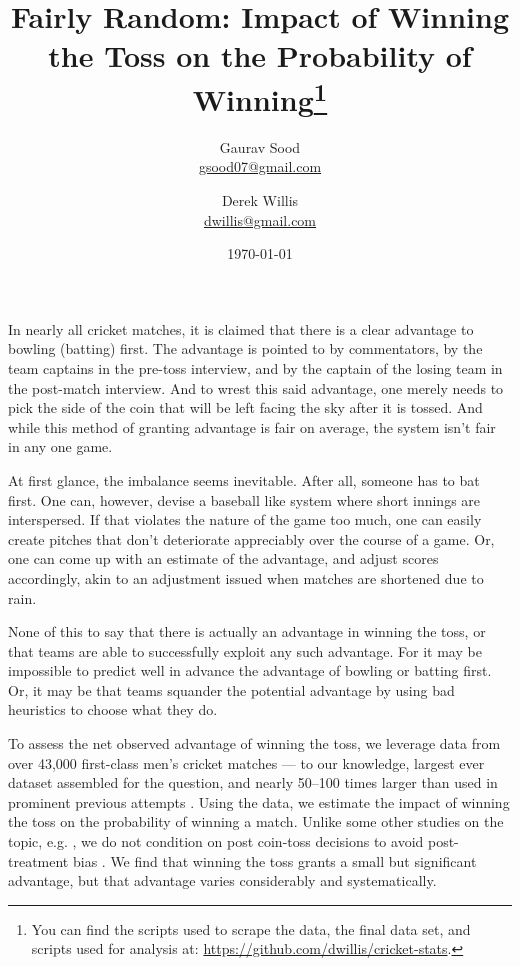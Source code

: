 \documentclass[12pt]{article}
\begin{document}
\title{\vspace{-.5cm}\normalsize{Fairly Random: Impact of Winning the Toss on the Probability of Winning\footnote{You can find the scripts used to scrape the data, the final data set, and scripts used for analysis at: \href{https://github.com/dwillis/cricket-stats}{https://github.com/dwillis/cricket-stats}.}\vspace{.5cm}}}
\author{\normalsize{Gaurav Sood}\\\href{mailto:gsood07@gmail.com}{\small{gsood07@gmail.com}} \and \normalsize{Derek Willis}\\\href{mailto:dwillis@gmail.com}{\small{dwillis@gmail.com}}}
\date{\vspace{.5cm}\normalsize{\today}}
\maketitle
\doublespacing

In nearly all cricket matches, it is claimed that there is a clear advantage to bowling (batting) first. The advantage is pointed to by commentators, by the team captains in the pre-toss interview, and by the captain of the losing team in the post-match interview. And to wrest this said advantage, one merely needs to pick the side of the coin that will be left facing the sky after it is tossed. And while this method of granting advantage is fair on average, the system isn't fair in any one game. 

At first glance, the imbalance seems inevitable. After all, someone has to bat first. One can, however, devise a baseball like system where short innings are interspersed. If that violates the nature of the game too much, one can easily create pitches that don't deteriorate appreciably over the course of a game. Or, one can come up with an estimate of the advantage, and adjust scores accordingly, akin to an adjustment issued when matches are shortened due to rain.

None of this to say that there is actually an advantage in winning the toss, or that teams are able to successfully exploit any such advantage. For it may be impossible to predict well in advance the advantage of bowling or batting first. Or, it may be that teams squander the potential advantage by using bad heuristics to choose what they do.

To assess the net observed advantage of winning the toss, we leverage data from over 43,000 first-class men's cricket matches --- to our knowledge, largest ever dataset assembled for the question, and nearly 50--100 times larger than used in prominent previous attempts \citep[see,][]{dawson2009bat, de1998winning}. Using the data, we estimate the impact of winning the toss on the probability of winning a match. Unlike some other studies on the topic, e.g. \citet{dawson2009bat, Saad2015}, we do not condition on post coin-toss decisions to avoid post-treatment bias \citep[see][]{acharya2015}. We find that winning the toss grants a small but significant advantage, but that advantage varies considerably and systematically. 
\end{document}
